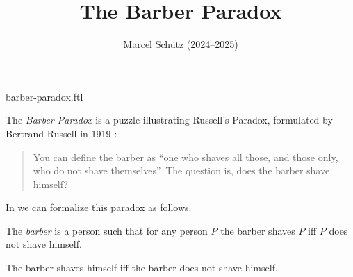 \documentclass{article}
\title{The Barber Paradox}
\author{Marcel Schütz (2024--2025)}
\date{}
\begin{document}
\begin{smodule}{barber-paradox.ftl}
\maketitle


\noindent The \emph{Barber Paradox} is a puzzle illustrating Russell's
Paradox, formulated by Bertrand Russell in 1919 \cite[p. 355]{Russell1919}:

\begin{quotation}
  \ifstexhtml\else\noindent\fi
  You can define the barber as ``one who shaves all those, and 
  those only, who do not shave themselves''.
  The question is, does the barber shave himself?
\end{quotation}

\noindent In \Naproche we can formalize this paradox as follows.

\begin{forthel}
  \begin{signature*}
    The \emph{barber} is a person such that for any person $P$ the barber shaves $P$ iff $P$ does not shave himself.
  \end{signature*}
  
  \begin{theorem*}[title=Barber Paradox,id=barber_paradox]
    The barber shaves himself iff the barber does not shave himself.
  \end{theorem*}
\end{forthel}

\printbibliography
{}
\end{smodule}
\end{document}

